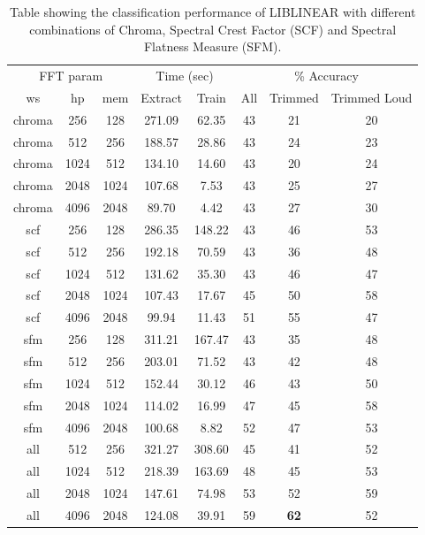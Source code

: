 \documentclass[12pt,oneside]{book}
\begin{document}
\begin{table}
\begin{tabular}{|c|c|c|c|c|c|c|c|}
\hline
\multicolumn{3}{|c|}{FFT param} & \multicolumn{2}{c|}{Time (sec)} & \multicolumn{3}{c|}{\% Accuracy} \\
\hhline{|-|-|-|-|-|-|-|-|}
ws & hp & mem & Extract & Train & All & Trimmed & Trimmed Loud \\
\hhline{|=|=|=|=|=|=|=|=|}
chroma & 256 & 128    &   271.09  &   62.35  &  43  & 21 & 20 \\
chroma & 512 & 256    &   188.57  &   28.86  &  43  & 24 & 23 \\
chroma & 1024 & 512   &   134.10  &   14.60  &  43  & 20 & 24 \\
chroma & 2048 & 1024  &   107.68  &    7.53  &  43  & 25 & 27 \\
chroma & 4096 & 2048  &    89.70  &    4.42  &  43  & 27 & 30 \\
\hline
scf & 256 & 128       &   286.35  &  148.22  &  43  & 46 & 53 \\
scf & 512 & 256       &   192.18  &   70.59  &  43  & 36 & 48 \\
scf & 1024 & 512      &   131.62  &   35.30  &  43  & 46 & 47 \\
scf & 2048 & 1024     &   107.43  &   17.67  &  45  & 50 & 58 \\
scf & 4096 & 2048     &    99.94  &   11.43  &  51  & 55 & 47 \\
\hline
sfm & 256 & 128       &   311.21  &  167.47  &  43  & 35 & 48 \\
sfm & 512 & 256       &   203.01  &   71.52  &  43  & 42 & 48 \\
sfm & 1024 & 512      &   152.44  &   30.12  &  46  & 43 & 50 \\
sfm & 2048 & 1024     &   114.02  &   16.99  &  47  & 45 & 58 \\
sfm & 4096 & 2048     &   100.68  &    8.82  &  52  & 47 & 53 \\
\hline
all & 512 & 256       &   321.27  &  308.60  &  45  & 41 & 52 \\
all & 1024 & 512      &   218.39  &  163.69  &  48  & 45 & 53 \\
all & 2048 & 1024     &   147.61  &   74.98  &  53  & 52 & 59 \\
all & 4096 & 2048     &   124.08  &   39.91  &  59  & \textbf{62} & 52 \\
\hline
\end{tabular}
\caption{Table showing the classification performance
  of LIBLINEAR with different combinations of Chroma, Spectral Crest
  Factor (SCF) and Spectral Flatness Measure (SFM).}
\label{table:calls-different-chroma}
\end{table}
\end{document}
